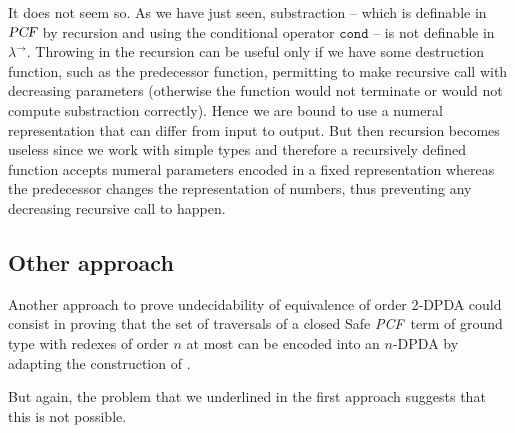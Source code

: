 \documentclass{article}
\newcommand\nat{\mathbb{N}}
\newcommand{\betared}{\rightarrow_\beta}
\newcommand{\encode}[1]{\ulcorner #1 \urcorner}
\newcommand\pcf{\textsl{PCF}}
\newcommand\pcfcond{\texttt{cond}}
\begin{document}
It does not seem so. As we have just seen, substraction -- which is definable in $\pcf$  by recursion and using the conditional operator $\pcfcond$ -- is not definable in $\lambda^\rightarrow$. Throwing in the recursion
can  be useful only if we have some destruction function, such as the predecessor function, permitting to make recursive call with decreasing parameters (otherwise the function would not terminate or would not compute substraction correctly). Hence we are bound to use a numeral representation
that can differ from input to output. But then recursion becomes useless since we work with simple types and therefore a recursively defined function accepts numeral parameters encoded in a fixed representation whereas the predecessor changes the representation of numbers, thus preventing any decreasing recursive call to happen.

%
%
%

\subsection{Other approach}

Another approach to prove undecidability of equivalence of order $2$-DPDA could consist in proving that the set of traversals of a closed Safe \pcf\ term of ground type with redexes of order $n$ at most can be encoded into an $n$-DPDA by adapting the construction of \cite{KNU02}. 

But again, the problem that we underlined in the first approach suggests  that this is not possible. 



\end{document}
